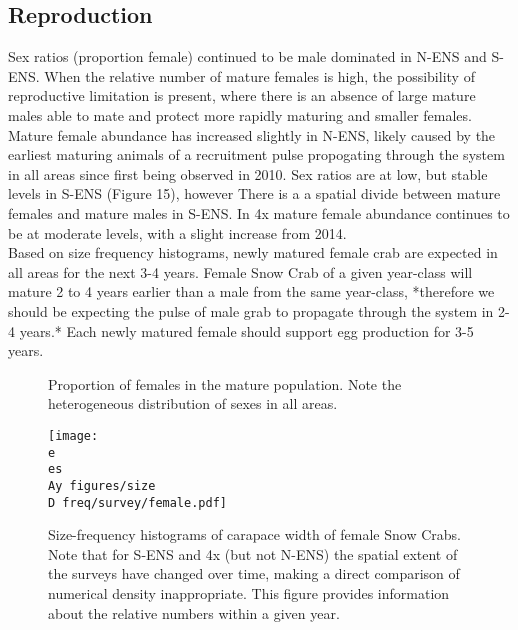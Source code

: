 \documentclass[paper=a4, fontsize=11pt]{article}
\newcommand{\D}{.}
\newcommand{\e}{/home/michelle/ecomod_data/}
\newcommand{\es}{snowcrab/}
\newcommand{\Ay}{assessments/2015/}
\begin{document}
\subsection{Reproduction}

Sex ratios (proportion female) continued to be male dominated in N-ENS and S-ENS. When the relative number of mature females is high, the possibility of reproductive limitation is present, where there is an absence of large mature males able to mate and protect more rapidly maturing and smaller females. Mature female abundance has increased slightly in N-ENS, likely caused by the earliest maturing animals of a recruitment pulse propogating through the system in all areas since first being observed in 2010. Sex ratios are at low, but stable levels in S-ENS (Figure 15), however There is a a spatial divide between mature females and mature males in S-ENS. In 4x mature female abundance continues to be at moderate levels, with a slight increase from 2014.\\

 Based on size frequency histograms, newly matured female crab are expected in all areas for the next 3-4 years. Female Snow Crab of a given year-class will mature 2 to 4 years earlier than a male from the same year-class, *therefore we should be expecting the pulse of male grab to propagate through the system in 2-4 years.* Each newly matured female should support egg production for 3-5 years. \\


\begin{figure}[h]
  \centering
  \caption{Proportion of females in the mature population. Note the heterogeneous distribution of sexes in all areas.}
\end{figure}
\clearpage


\begin{figure}[h]
    \centering
    \texttt{[image: \\e \\es \\Ay figures/size\\D freq/survey/female.pdf]}
    \caption{Size-frequency histograms of carapace width of female Snow Crabs. Note that for S-ENS and 4x (but not N-ENS) the spatial extent of the surveys have changed over time, making a direct comparison of numerical density inappropriate. This figure provides information about the relative numbers within a given year.}
\end{figure}
\clearpage
\end{document}

